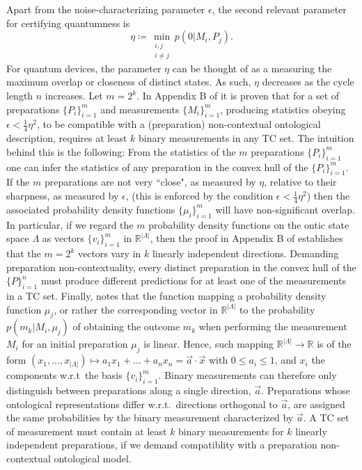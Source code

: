 Apart from the noise-characterizing parameter $\epsilon$, the second relevant parameter for certifying quantumness is
\begin{equation}
\eta\coloneqq \min_{\substack{i,j \\ i\neq j}} p(0\vert M_i, P_j).
\end{equation}
For quantum devices, the parameter $\eta$ can be thought of as a measuring the maximum overlap or closeness of distinct states. As such, $\eta$ decreases as the cycle length $n$ increases. Let $m=2^k$. In Appendix B of \cite{Pusey2019a} it is proven that for a set of preparations $\{P_i\}_{i=1}^m$ and measurements $\{M_i\}_{i=1}^m$, producing statistics obeying $\epsilon<\frac{1}{4}\eta^2$, to be compatible with a (preparation) non-contextual ontological description, requires at least $k$ binary measurements in any TC set. The intuition behind this is the following: From the statistics of the $m$ preparations $\{P_i\}_{i=1}^m$ one can infer the statistics of any preparation in the convex hull of the $\{P_i\}_{i=1}^m$. If the $m$ preparations are not very ``close", as measured by $\eta$, relative to their sharpness, as measured by $\epsilon$, (this is enforced by the condition $\epsilon<\frac{1}{4}\eta^2$) then the associated probability density functions $\{\mu_i\}_{i=1}^m$ will have non-significant overlap. In particular, if we regard the $m$ probability density functions on the ontic state space $\Lambda$ as vectors $\{v_i\}_{i=1}^m$ in $\mathbb{R}^{\vert \Lambda \vert}$, then the proof in Appendix B of \cite{Pusey2019a} establishes that the $m=2^k$ vectors vary in $k$ linearly independent directions. Demanding preparation non-contextuality, every distinct preparation in the convex hull of the $\{P\}_{i=1}^n$ must produce different predictions for at least one of the measurements in a TC set. Finally, \cite{Pusey2019a} notes that the function mapping a probability density function $\mu_j$, or rather the corresponding vector in $\mathbb{R}^{\vert \Lambda \vert}$ to the probability $p(m_k\vert M_i,\mu_j)$ of obtaining the outcome $m_k$ when performing the measurement $M_i$ for an initial preparation $\mu_j$ is linear. Hence, such mapping $\mathbb{R}^{\vert \Lambda \vert}\rightarrow\mathbb{R}$ is of the form $(x_1,\dots,x_{\vert \Lambda \vert})\mapsto a_1 x_1+\dots + a_n x_n = \vec{a}\cdot \vec{x}$ with $0 \leq a_i \leq 1$, and $x_i$ the components w.r.t\ the basis $\{v_i\}_{i=1}^m$. Binary measurements can therefore only distinguish between preparations along a single direction, $\vec{a}$. Preparations whose ontological representations differ w.r.t.\ directions orthogonal to $\vec{a}$, are assigned the same probabilities by the binary measurement characterized by $\vec{a}$. A TC set of measurement must contain at least $k$ binary measurements for $k$ linearly independent preparations, if we demand compatiblity with a preparation non-contextual ontological model.

